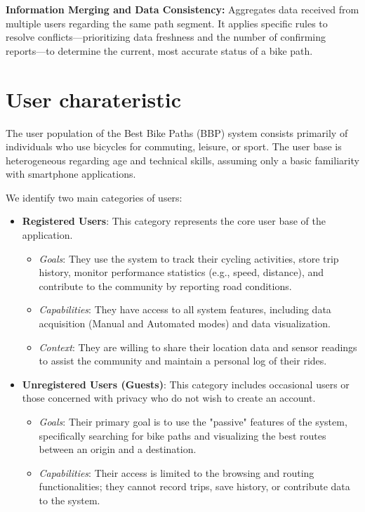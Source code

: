 \textbf{Information Merging and Data Consistency:} Aggregates data received from multiple users regarding the same path segment. It applies specific rules to resolve conflicts—prioritizing data freshness and the number of confirming reports—to determine the current, most accurate status of a bike path.
\section{User charateristic}
The user population of the Best Bike Paths (BBP) system consists primarily of individuals who use bicycles for commuting, leisure, or sport. The user base is heterogeneous regarding age and technical skills, assuming only a basic familiarity with smartphone applications.

We identify two main categories of users:

\begin{itemize}
    \item \textbf{Registered Users}: This category represents the core user base of the application.
    \begin{itemize}
        \item \textit{Goals}: They use the system to track their cycling activities, store trip history, monitor performance statistics (e.g., speed, distance), and contribute to the community by reporting road conditions.
        \item \textit{Capabilities}: They have access to all system features, including data acquisition (Manual and Automated modes) and data visualization.
        \item \textit{Context}: They are willing to share their location data and sensor readings to assist the community and maintain a personal log of their rides.
    \end{itemize}

    \item \textbf{Unregistered Users (Guests)}: This category includes occasional users or those concerned with privacy who do not wish to create an account.
    \begin{itemize}
        \item \textit{Goals}: Their primary goal is to use the "passive" features of the system, specifically searching for bike paths and visualizing the best routes between an origin and a destination.
        \item \textit{Capabilities}: Their access is limited to the browsing and routing functionalities; they cannot record trips, save history, or contribute data to the system.
    \end{itemize}
\end{itemize}
